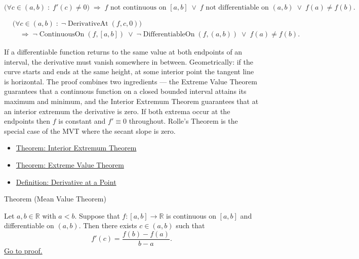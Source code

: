 \begin{remark*}
\[
\bigl(\forall c \in (a,b)\;:\; f'(c) \ne 0\bigr)
\;\Rightarrow\;
f \text{ not continuous on } [a,b]
\;\lor\;
f \text{ not differentiable on } (a,b)
\;\lor\;
f(a) \ne f(b).
\]
\end{remark*}

\begin{remark*}
\begin{align*}
&\bigl(\forall c\in(a,b)\;:\;\neg\operatorname{DerivativeAt}(f,c,0)\bigr)\\
&\quad\Longrightarrow\;
\neg\operatorname{ContinuousOn}(f,[a,b])
\;\lor\;
\neg\operatorname{DifferentiableOn}(f,(a,b))
\;\lor\;
f(a)\ne f(b).
\end{align*}
\end{remark*}

\begin{remark*}[Interpretation]
If a differentiable function returns to the same value at both endpoints of an interval, the derivative must vanish somewhere in between. Geometrically: if the curve starts and ends at the same height, at some interior point the tangent line is horizontal. The proof combines two ingredients --- the Extreme Value Theorem guarantees that a continuous function on a closed bounded interval attains its maximum and minimum, and the Interior Extremum Theorem guarantees that at an interior extremum the derivative is zero. If both extrema occur at the endpoints then $f$ is constant and $f' \equiv 0$ throughout. Rolle's Theorem is the special case of the MVT where the secant slope is zero.
\end{remark*}

\begin{dependencies}
\begin{itemize}
  \item \hyperref[thm:interior-extremum-theorem]{Theorem: Interior Extremum Theorem}
  \item \hyperref[thm:extreme-value-theorem]{Theorem: Extreme Value Theorem}
  \item \hyperref[def:derivative-at-a-point]{Definition: Derivative at a Point}
\end{itemize}
\end{dependencies}


\begin{theorembox}{Theorem (Mean Value Theorem)}
\begin{theorem}
\label{thm:mean-value-theorem}
Let $a, b \in \mathbb{R}$ with $a < b$. Suppose that $f : [a,b] \to \mathbb{R}$ is continuous on $[a,b]$ and differentiable on $(a,b)$. Then there exists $c \in (a,b)$ such that
\[
f'(c) = \frac{f(b) - f(a)}{b - a}.
\]
\hyperref[prf:mean-value-theorem]{Go to proof.}
\end{theorem}
\end{theorembox}

